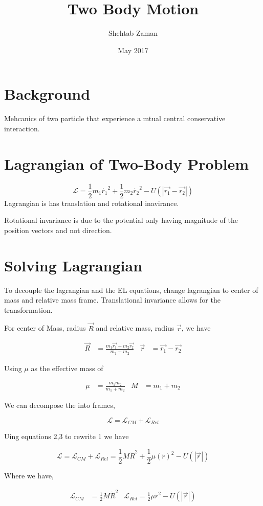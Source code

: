 \documentclass{article}
\title{Two Body Motion}
\author{Shehtab Zaman }
\date{May 2017}
\begin{document}
\maketitle
\section{Background}
Mehcanics of two particle that experience a mtual central conservative interaction.
\section{Lagrangian of Two-Body Problem}
\begin{equation}
  \mathcal{L} = \frac{1}{2}m_1 \dot{r_1}^2 + \frac{1}{2}m_2 \dot{r_2}^2
  -U\left(|\vec{r_1} - \vec{r_2}|\right)
\end{equation}
Lagrangian is has translation and rotational  inavirance.

Rotational invariance is due to the potential only having magnitude of the
position vectors and not direction.

\section{Solving Lagrangian}
To decouple the lagrangian and the EL equations, change lagrangian to center of
mass and relative mass frame. Translational invariance allows for the
transformation.


For center of Mass, radius $\vec{R}$ and relative mass, radius $ \vec{r}$, we
have

\begin{align}
\vec{R} &= \frac{m_1 \vec{r_1 } + m_2 \vec{r_2}}{m_1 + m_2}
 &
\vec{r} &= \vec{r_1}-\vec{r_2}
\end{align}

Using $\mu$ as the effective mass of

\begin{align}
  \mu &= \frac{m_1m_2}{m_1+ m_2} &
  M &= m_1 + m_2
\end{align}

We can decompose the into frames,

\begin{equation}
\mathcal{L} = \mathcal{L}_{CM} + \mathcal{L}_{Rel}
\end{equation}

Uing equations 2,3 to rewrite 1 we have

\begin{equation}
\mathcal{L} = \mathcal{L}_{CM} + \mathcal{L}_{Rel}
= \frac{1}{2}M\dot{R}^2 + \frac{1}{2}\mu(\dot{r})^2 - U(|\vec{r}|)
\end{equation}

Where we have,

\begin{align}
\mathcal{L}_{CM} &= \frac{1}{2}M\dot{R}^2 & \mathcal{L}_{Rel} = \frac{1}{2}\mu\dot{r}^2-U(|\vec{r}|)
\end{align}
\end{document}
